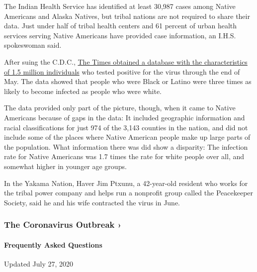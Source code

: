 The Indian Health Service has identified at least 30,987 cases among
Native Americans and Alaska Natives, but tribal nations are not required
to share their data. Just under half of tribal health centers and 61
percent of urban health services serving Native Americans have provided
case information, an I.H.S. spokeswoman said.

After suing the C.D.C.,
\href{https://www.nytimes.com/interactive/2020/07/05/us/coronavirus-latinos-african-americans-cdc-data.html}{The
Times obtained a database with the characteristics of 1.5 million
individuals} who tested positive for the virus through the end of May.
The data showed that people who were Black or Latino were three times as
likely to become infected as people who were white.

The data provided only part of the picture, though, when it came to
Native Americans because of gaps in the data: It included geographic
information and racial classifications for just 974 of the 3,143
counties in the nation, and did not include some of the places where
Native American people make up large parts of the population. What
information there was did show a disparity: The infection rate for
Native Americans was 1.7 times the rate for white people over all, and
somewhat higher in younger age groups.

In the Yakama Nation, Haver Jim Ptxunu, a 42-year-old resident who works
for the tribal power company and helps run a nonprofit group called the
Peacekeeper Society, said he and his wife contracted the virus in June.

\href{https://www.nytimes.com/news-event/coronavirus?action=click\&pgtype=Article\&state=default\&region=MAIN_CONTENT_3\&context=storylines_faq}{}

\hypertarget{the-coronavirus-outbreak-}{%
\subsubsection{The Coronavirus Outbreak
›}\label{the-coronavirus-outbreak-}}

\hypertarget{frequently-asked-questions}{%
\paragraph{Frequently Asked
Questions}\label{frequently-asked-questions}}

Updated July 27, 2020

